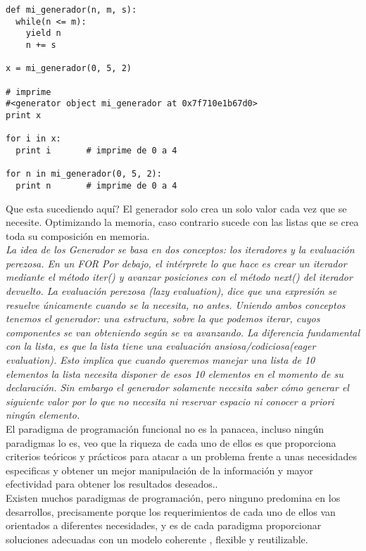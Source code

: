\begin{multicols}{2}
\lstset{language=Python,frame=tb,framesep=5pt,basicstyle=\footnotesize}   
\begin{lstlisting}
def mi_generador(n, m, s):
  while(n <= m):
    yield n
    n += s

x = mi_generador(0, 5, 2)

# imprime 
#<generator object mi_generador at 0x7f710e1b67d0>
print x 

for i in x:
  print i		# imprime de 0 a 4

for n in mi_generador(0, 5, 2):
  print n		# imprime de 0 a 4         
\end{lstlisting}

Que esta sucediendo aquí? El generador solo crea un solo valor cada vez  que se necesite. Optimizando
la memoria, caso contrario sucede con las listas que se crea toda su composición en memoria.\\

\cite{kopka} \textit{La idea de los Generador se basa en dos conceptos: los iteradores y la evaluación perezosa.
En un FOR Por debajo, el intérprete lo que hace es crear un iterador mediante el método iter() y avanzar posiciones con el método next() del iterador devuelto.
La evaluación perezosa (lazy evaluation), dice que una expresión se resuelve únicamente cuando se la necesita, no antes.
Uniendo ambos conceptos tenemos el generador: una estructura, sobre la que podemos iterar, cuyos componentes se van obteniendo según se va avanzando.
La diferencia fundamental con la lista, es que la lista tiene una evaluación ansiosa/codiciosa(eager evaluation). Esto implica que cuando queremos manejar una 
lista de 10 elementos la lista necesita disponer de esos 10 elementos en el momento de su declaración. Sin embargo el generador solamente necesita saber cómo 
generar el siguiente valor por lo que no necesita ni reservar espacio ni conocer a priori ningún elemento.}\\

El paradigma de programación funcional no es la panacea, incluso ningún paradigmas lo es, veo que la riqueza de cada uno de 
ellos es que proporciona criterios teóricos y prácticos  para atacar a un problema frente a unas necesidades especificas y 
obtener  un mejor manipulación de la información y mayor efectividad para obtener los resultados deseados..\\

Existen muchos paradigmas de programación, pero ninguno predomina en los desarrollos, precisamente porque los requerimientos de cada
uno de ellos van orientados a diferentes necesidades, y es de cada paradigma proporcionar soluciones adecuadas con un  modelo coherente
, flexible y reutilizable.\\


\end{multicols}
